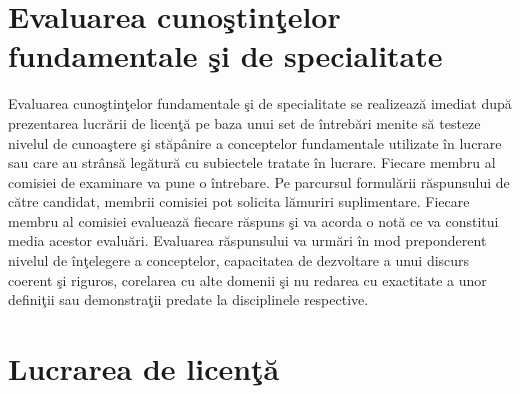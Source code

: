 \documentclass{article}
\begin{document}
\section {Evaluarea cunoştinţelor fundamentale şi de specialitate}

Evaluarea cunoştinţelor fundamentale şi de specialitate se realizeaz\u{a} imediat dup\u{a}
prezentarea lucr\u{a}rii de licenţ\u{a} pe baza unui set de \^{i}ntreb\u{a}ri menite s\u{a} testeze nivelul de
cunoaştere şi st\u{a}pânire a conceptelor fundamentale utilizate \^{i}n lucrare sau care au
strâns\u{a} leg\u{a}tur\u{a} cu subiectele tratate \^{i}n lucrare. Fiecare membru al comisiei de
examinare va pune o \^{i}ntrebare. Pe parcursul formul\u{a}rii r\u{a}spunsului de c\u{a}tre candidat,
membrii comisiei pot solicita l\u{a}muriri suplimentare. Fiecare membru al comisiei
evalueaz\u{a} fiecare r\u{a}spuns şi va acorda o not\u{a} ce va constitui media acestor evalu\u{a}ri.
Evaluarea r\u{a}spunsului va urm\u{a}ri \^{i}n mod preponderent nivelul de \^{i}nţelegere a
conceptelor, capacitatea de dezvoltare a unui discurs coerent şi riguros, corelarea cu
alte domenii şi nu redarea cu exactitate a unor definiţii sau demonstraţii predate la
disciplinele respective. 

\section {Lucrarea de licenţ\u{a}}
\end{document}
